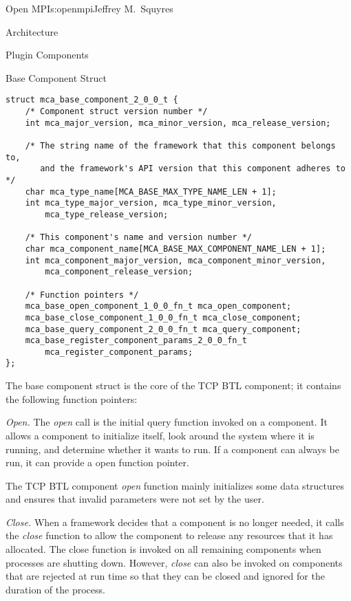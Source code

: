 \begin{aosachapter}{Open MPI}{s:openmpi}{Jeffrey M.\ Squyres}
\begin{aosasect1}{Architecture}
\begin{aosasect2}{Plugin Components}

\begin{aosabox}{Base Component Struct}
\begin{verbatim}
struct mca_base_component_2_0_0_t {
    /* Component struct version number */
    int mca_major_version, mca_minor_version, mca_release_version;

    /* The string name of the framework that this component belongs to,
       and the framework's API version that this component adheres to */
    char mca_type_name[MCA_BASE_MAX_TYPE_NAME_LEN + 1];
    int mca_type_major_version, mca_type_minor_version,  
        mca_type_release_version;

    /* This component's name and version number */
    char mca_component_name[MCA_BASE_MAX_COMPONENT_NAME_LEN + 1];
    int mca_component_major_version, mca_component_minor_version,
        mca_component_release_version;

    /* Function pointers */  
    mca_base_open_component_1_0_0_fn_t mca_open_component;
    mca_base_close_component_1_0_0_fn_t mca_close_component;
    mca_base_query_component_2_0_0_fn_t mca_query_component;
    mca_base_register_component_params_2_0_0_fn_t 
        mca_register_component_params;
};
\end{verbatim}
\end{aosabox}

The base component struct is the core of the TCP BTL component; it
contains the following function pointers:

\begin{aosaitemize}
\item \emph{Open.} The \emph{open} call is the initial query function
  invoked on a component.  It allows a component to initialize itself,
  look around the system where it is running, and determine whether it
  wants to run.  If a component can always be run, it can provide a
   open function pointer.

  The TCP BTL component \emph{open} function mainly initializes some
  data structures and ensures that invalid parameters were not set by
  the user.

\item \emph{Close.} When a framework decides that a component is no
  longer needed, it calls the \emph{close} function to allow the
  component to release any resources that it has allocated.  The close
  function is invoked on all remaining components when processes are
  shutting down.  However, \emph{close} can also be invoked on
  components that are rejected at run time so that they can be closed
  and ignored for the duration of the process.


\end{aosaitemize}
\end{aosasect2}
\end{aosasect1}
\end{aosachapter}
